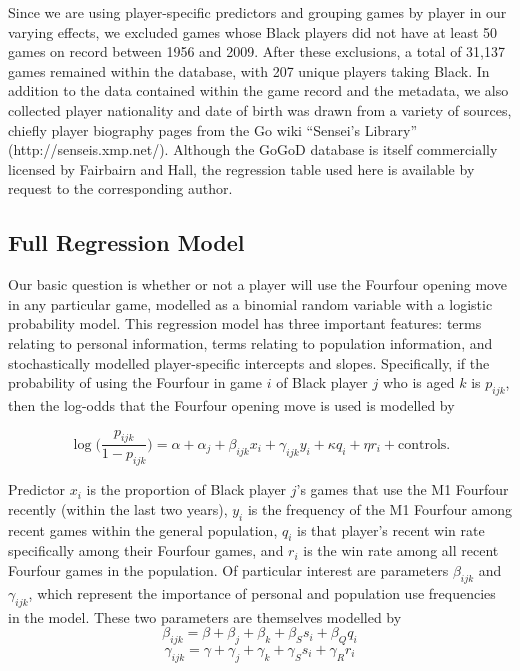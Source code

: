 \documentclass[reqno,12pt]{amsart}
\begin{document}
Since we are using player-specific predictors and grouping games by
player in our varying effects, we excluded games whose Black players did
not have at least 50 games on record between 1956 and 2009. After these
exclusions, a total of 31,137 games remained within the database, with
207 unique players taking Black. In addition to the data contained
within the game record and the metadata, we also collected player
nationality and date of birth was drawn from a variety of sources,
chiefly player biography pages from the Go wiki ``Sensei's Library''
(http://senseis.xmp.net/). Although the GoGoD database is itself
commercially licensed by Fairbairn and Hall, the regression table used
here is available by request to the corresponding author.

\subsection{Full Regression Model}\label{full-regression-model}

Our basic question is whether or not a player will use the Fourfour
opening move in any particular game, modelled as a binomial random
variable with a logistic probability model. This regression model has
three important features: terms relating to personal information, terms
relating to population information, and stochastically modelled
player-specific intercepts and slopes. Specifically, if the probability
of using the Fourfour in game \(i\) of Black player \(j\) who is aged
\(k\) is \(p_{ijk}\), then the log-odds that the Fourfour opening move
is used is modelled by

\begin{equation} \label{eq:model}
  \log\bigg(\frac{p_{ijk}}{1-p_{ijk}}\bigg) = \alpha + \alpha_j + \beta_{ijk}x_i + \gamma_{ijk}y_i + \kappa q_i + \eta r_i + \textrm{controls}.
\end{equation}

Predictor \(x_i\) is the proportion of Black player \(j\)'s games that
use the M1 Fourfour recently (within the last two years), \(y_i\) is the
frequency of the M1 Fourfour among recent games within the general
population, \(q_i\) is that player's recent win rate specifically among
their Fourfour games, and \(r_i\) is the win rate among all recent
Fourfour games in the population. Of particular interest are parameters
\(\beta_{ijk}\) and \(\gamma_{ijk}\), which represent the importance of
personal and population use frequencies in the model. These two
parameters are themselves modelled by \[
  \beta_{ijk} = \beta + \beta_j + \beta_k + \beta_{S} s_{i} + \beta_{Q} q_{i}
\] \[
  \gamma_{ijk} = \gamma + \gamma_j + \gamma_k + \gamma_{S} s_{i} + \gamma_{R} r_{i}
\]
\end{document}

